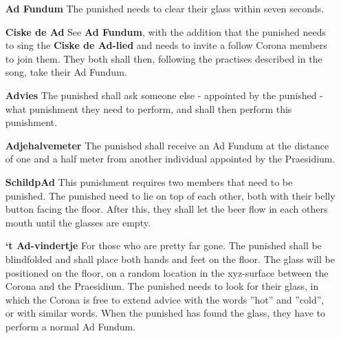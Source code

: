 \begin{itemize}
    \item[\textbf{Ad Fundum}] %
    The punished needs to clear their glass within seven seconds.
    
    \item[\textbf{Ciske de Ad}] %
    See \textbf{Ad Fundum}, with the addition that the punished needs to sing the \textbf{Ciske de Ad-lied} and needs to invite a follow Corona members to join them. They both shall then, following the practises described in the song, take their Ad Fundum. 
    
    \item[\textbf{Advies}] %
    The punished shall ask someone else - appointed by the punished - what punishment they need to perform, and shall then perform this punishment.

    \item[\textbf{Adjehalvemeter}] %
    The punished shall receive an Ad Fundum at the distance of one and a half meter from another individual appointed by the Praesidium. 
    
    \item[\textbf{SchildpAd}] 
    This punishment requires two members that need to be punished. The punished need to lie on top of each other, both with their belly button facing the floor. After this, they shall let the beer flow in each others mouth until the glasses are empty. 
    
    \item[\textbf{‘t Ad-vindertje}] %
    For those who are pretty far gone. The punished shall be blindfolded and shall place both hands and feet on the floor. The glass will be positioned on the floor, on a random location in the xyz-surface between the Corona and the Praesidium. The punished needs to look for their glass, in which the Corona is free to extend advice with the words ''hot'' and ''cold'', or with similar words. When the punished has found the glass, they have to perform a normal Ad Fundum.
    

\end{itemize}
